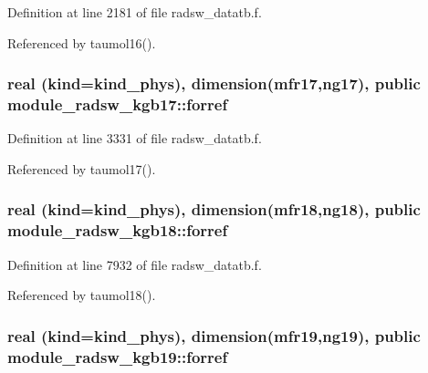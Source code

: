 Definition at line 2181 of file radsw\+\_\+datatb.\+f.



Referenced by taumol16().

\subsubsection[{\texorpdfstring{forref}{forref}}]{\setlength{\rightskip}{0pt plus 5cm}real (kind=kind\+\_\+phys), dimension(mfr17,ng17), public module\+\_\+radsw\+\_\+kgb17\+::forref}\hypertarget{group__module__radsw__main_ga5041a137ba35dca9a767ce854748dd49}{}\label{group__module__radsw__main_ga5041a137ba35dca9a767ce854748dd49}


Definition at line 3331 of file radsw\+\_\+datatb.\+f.



Referenced by taumol17().

\subsubsection[{\texorpdfstring{forref}{forref}}]{\setlength{\rightskip}{0pt plus 5cm}real (kind=kind\+\_\+phys), dimension(mfr18,ng18), public module\+\_\+radsw\+\_\+kgb18\+::forref}\hypertarget{group__module__radsw__main_ga0efc293c91de3d17b29ed713ff09d7a9}{}\label{group__module__radsw__main_ga0efc293c91de3d17b29ed713ff09d7a9}


Definition at line 7932 of file radsw\+\_\+datatb.\+f.



Referenced by taumol18().

\subsubsection[{\texorpdfstring{forref}{forref}}]{\setlength{\rightskip}{0pt plus 5cm}real (kind=kind\+\_\+phys), dimension(mfr19,ng19), public module\+\_\+radsw\+\_\+kgb19\+::forref}\hypertarget{group__module__radsw__main_gabb4c30ad8e82694b33df78bb2687df6d}{}\label{group__module__radsw__main_gabb4c30ad8e82694b33df78bb2687df6d}


